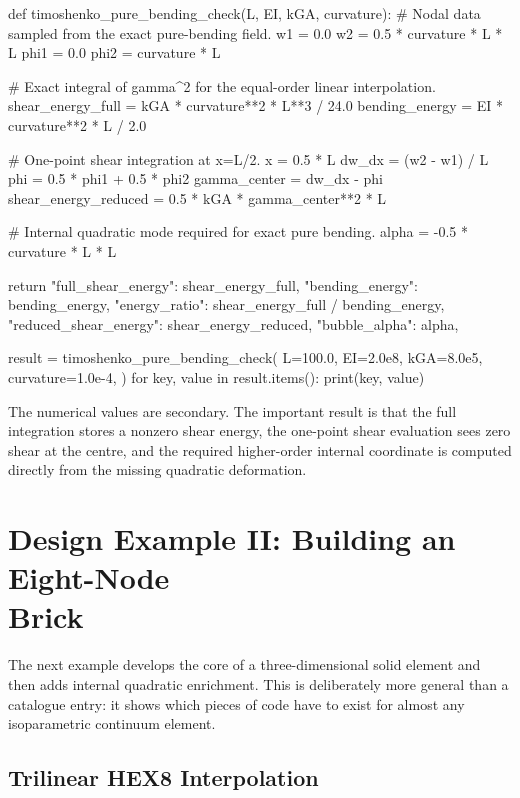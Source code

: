 \begin{python}
def timoshenko_pure_bending_check(L, EI, kGA, curvature):
    # Nodal data sampled from the exact pure-bending field.
    w1 = 0.0
    w2 = 0.5 * curvature * L * L
    phi1 = 0.0
    phi2 = curvature * L

    # Exact integral of gamma^2 for the equal-order linear interpolation.
    shear_energy_full = kGA * curvature**2 * L**3 / 24.0
    bending_energy = EI * curvature**2 * L / 2.0

    # One-point shear integration at x=L/2.
    x = 0.5 * L
    dw_dx = (w2 - w1) / L
    phi = 0.5 * phi1 + 0.5 * phi2
    gamma_center = dw_dx - phi
    shear_energy_reduced = 0.5 * kGA * gamma_center**2 * L

    # Internal quadratic mode required for exact pure bending.
    alpha = -0.5 * curvature * L * L

    return {
        "full_shear_energy": shear_energy_full,
        "bending_energy": bending_energy,
        "energy_ratio": shear_energy_full / bending_energy,
        "reduced_shear_energy": shear_energy_reduced,
        "bubble_alpha": alpha,
    }


result = timoshenko_pure_bending_check(
    L=100.0,
    EI=2.0e8,
    kGA=8.0e5,
    curvature=1.0e-4,
)
for key, value in result.items():
    print(key, value)
\end{python}

The numerical values are secondary. The important result is that the full
integration stores a nonzero shear energy, the one-point shear evaluation sees
zero shear at the centre, and the required higher-order internal coordinate is
computed directly from the missing quadratic deformation.

\section[Building an Eight-Node Brick]{Design Example II: Building an Eight-Node\\Brick}

The next example develops the core of a three-dimensional solid element and then
adds internal quadratic enrichment. This is deliberately more general than a
catalogue entry: it shows which pieces of code have to exist for almost any
isoparametric continuum element.

\subsection{Trilinear HEX8 Interpolation}

